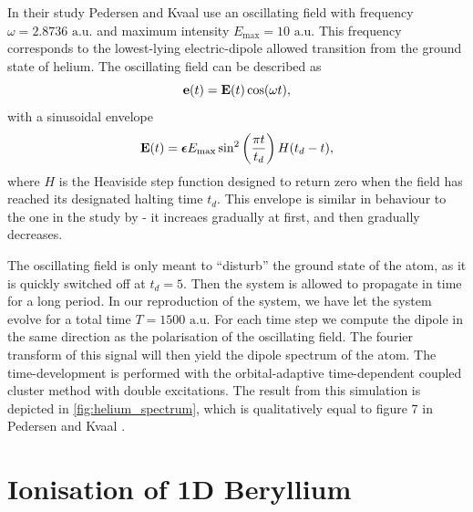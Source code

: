 In their study Pedersen and Kvaal \cite{pedersen2019symplectic} use an oscillating field with 
frequency $\omega=2.8736 \text{ a.u.}$ and maximum intensity
$E_\text{max} = 10 \text{ a.u.}$ This frequency corresponds to the lowest-lying 
electric-dipole allowed transition from the ground state of helium. The oscillating 
field can be described as 
\begin{equation}
    \vb{e}(t) = \vb{E}(t) \cos(\omega t),
\end{equation}
with a sinusoidal envelope
\begin{equation}
    \label{eq:pedersen_2019_envelope}
    \vb{E}(t) = \boldsymbol{\epsilon} E_\text{max}\sin^2\left(\frac{\pi t}{t_d}\right) H(t_d - t),
\end{equation}
where $H$ is the Heaviside step function designed to return zero when the field 
has reached its designated halting time $t_d$. This envelope is similar in behaviour 
to the one in the study by \citeauthor{li2005time} \cite{li2005time} - it 
increaes gradually at first, and then gradually decreases. 

The oscillating field is only meant to ``disturb'' the ground state of the atom,
as it is quickly 
switched off at $t_d=5$. Then the system is allowed to propagate in time for 
a long period. In our reproduction of the system, we have let the system 
evolve for a total time $T=1500 \text{ a.u.}$ For each time step we compute the 
dipole in the same direction as the polarisation of the oscillating field. The 
fourier transform of this signal will then yield the dipole spectrum of the 
atom. The time-development is performed with the orbital-adaptive time-dependent 
coupled cluster method with double excitations. The result from this simulation is 
depicted in \autoref{fig:helium_spectrum}, which is qualitatively equal to figure 
7 in Pedersen and Kvaal \cite{pedersen2019symplectic}.

\section{Ionisation of 1D Beryllium}
\label{sec:miyagi_replication}


